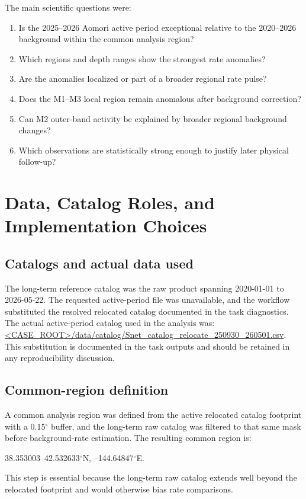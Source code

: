 \documentclass[11pt]{article}
\begin{document}
The main scientific questions were:
\begin{enumerate}[leftmargin=1.5em]
    \item Is the 2025--2026 Aomori active period exceptional relative to the 2020--2026 background within the common analysis region?
    \item Which regions and depth ranges show the strongest rate anomalies?
    \item Are the anomalies localized or part of a broader regional rate pulse?
    \item Does the M1--M3 local region remain anomalous after background correction?
    \item Can M2 outer-band activity be explained by broader regional background changes?
    \item Which observations are statistically strong enough to justify later physical follow-up?
\end{enumerate}

\section{Data, Catalog Roles, and Implementation Choices}
\subsection{Catalogs and actual data used}
The long-term reference catalog was the raw product spanning 2020-01-01 to 2026-05-22. The requested active-period file was unavailable, and the workflow substituted the resolved relocated catalog documented in the task diagnostics. The actual active-period catalog used in the analysis was:
\url{<CASE_ROOT>/data/catalog/Snet_catalog_relocate_250930_260501.csv}.
This substitution is documented in the task outputs and should be retained in any reproducibility discussion.

\subsection{Common-region definition}
A common analysis region was defined from the active relocated catalog footprint with a 0.15$^{\circ}$ buffer, and the long-term raw catalog was filtered to that same mask before background-rate estimation. The resulting common region is:
\begin{center}
38.353003--42.532633$^{\circ}$N, --144.64847$^{\circ}$E.
\end{center}
This step is essential because the long-term raw catalog extends well beyond the relocated footprint and would otherwise bias rate comparisons.
\end{document}
